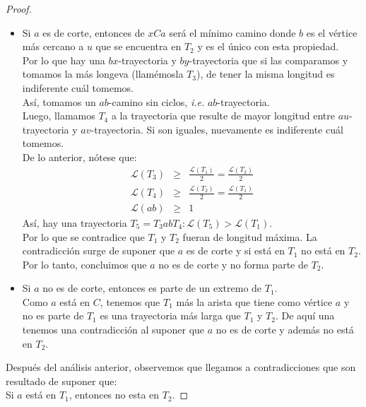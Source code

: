 \documentclass{article}
\begin{document}
\begin{enumerate}
\begin{proof}
\begin{itemize}
            \begin{itemize}
              \item Si $a$ es de corte, entonces de $xCa$ será el mínimo camino donde $b$ es el
                vértice más cercano a $u$ que se encuentra en $T_{2}$ y es el único con esta propiedad. \\
                Por lo que hay una $bx$-trayectoria y $by$-trayectoria que si las comparamos y tomamos la más
                longeva (llamémosla $T_{3}$), de tener la misma longitud es indiferente cuál tomemos. \\
                Así, tomamos un $ab$-camino sin ciclos, \textit{i.e.} $ab$-trayectoria. \\
                Luego, llamamos $T_{4}$ a la trayectoria que resulte de mayor longitud entre $au$-trayectoria
                y $av$-trayectoria. Si son iguales, nuevamente es indiferente cuál tomemos. \\
                De lo anterior, nótese que:
                \begin{eqnarray*}
                  \mathcal{L}(T_3) &\geq& \frac{\mathcal{L}(T_1)}{2} = \frac{\mathcal{L}(T_2)}{2}\\
                  \mathcal{L}(T_4) &\geq& \frac{\mathcal{L}(T_2)}{2} = \frac{\mathcal{L}(T_1)}{2}\\
                  \mathcal{L}(ab) &\geq& 1
                \end{eqnarray*}
                Así, hay una trayectoria $T_{5} = T_{3} ab T_{4}: \mathcal{L}(T_{5}) > \mathcal{L}(T_{1})$. \\
                Por lo que se contradice que $T_{1}$ y $T_{2}$ fueran de longitud máxima. La contradicción surge de
                suponer que $a$ es de corte y si está en $T_{1}$ no está en $T_{2}$. \\
                Por lo tanto, concluimos que $a$ no es de corte y no forma parte de $T_{2}$.

              \item Si $a$ no es de corte, entonces es parte de un extremo de $T_{1}$. \\
                Como $a$ está en $C$, tenemos que $T_{1}$ más la arista que tiene como vértice $a$ y
                no es parte de $T_{1}$ es una trayectoria más larga que $T_{1}$ y $T_{2}$. De aquí una tenemos una
                contradicción al suponer que $a$ no es de corte y además no está en $T_{2}$.
            \end{itemize}
        \end{itemize}
        Después del análisis anterior, observemos que llegamos a contradicciones que son resultado
        de suponer que: \\
        Si $a$ está en $T_{1}$, entonces no esta en $T_{2}$.


\end{proof}
\end{enumerate}
\end{document}

